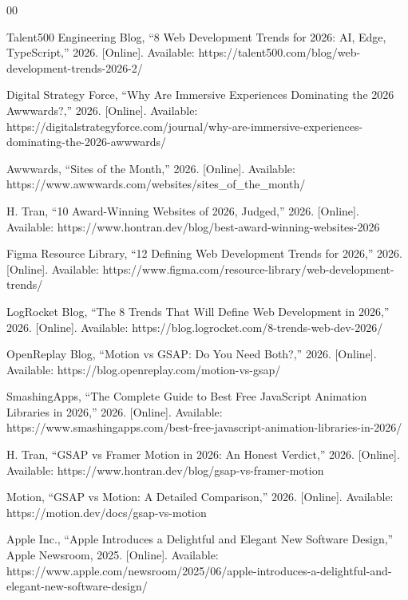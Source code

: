\documentclass[conference]{IEEEtran}
\begin{document}
\begin{thebibliography}{00}

 Talent500 Engineering Blog, ``8 Web Development Trends for 2026: AI, Edge, TypeScript,'' 2026. [Online]. Available: https://talent500.com/blog/web-development-trends-2026-2/

 Digital Strategy Force, ``Why Are Immersive Experiences Dominating the 2026 Awwwards?,'' 2026. [Online]. Available: https://digitalstrategyforce.com/journal/why-are-immersive-experiences-dominating-the-2026-awwwards/

 Awwwards, ``Sites of the Month,'' 2026. [Online]. Available: https://www.awwwards.com/websites/sites\_of\_the\_month/

 H. Tran, ``10 Award-Winning Websites of 2026, Judged,'' 2026. [Online]. Available: https://www.hontran.dev/blog/best-award-winning-websites-2026

 Figma Resource Library, ``12 Defining Web Development Trends for 2026,'' 2026. [Online]. Available: https://www.figma.com/resource-library/web-development-trends/

 LogRocket Blog, ``The 8 Trends That Will Define Web Development in 2026,'' 2026. [Online]. Available: https://blog.logrocket.com/8-trends-web-dev-2026/

 OpenReplay Blog, ``Motion vs GSAP: Do You Need Both?,'' 2026. [Online]. Available: https://blog.openreplay.com/motion-vs-gsap/

 SmashingApps, ``The Complete Guide to Best Free JavaScript Animation Libraries in 2026,'' 2026. [Online]. Available: https://www.smashingapps.com/best-free-javascript-animation-libraries-in-2026/

 H. Tran, ``GSAP vs Framer Motion in 2026: An Honest Verdict,'' 2026. [Online]. Available: https://www.hontran.dev/blog/gsap-vs-framer-motion

 Motion, ``GSAP vs Motion: A Detailed Comparison,'' 2026. [Online]. Available: https://motion.dev/docs/gsap-vs-motion

 Apple Inc., ``Apple Introduces a Delightful and Elegant New Software Design,'' Apple Newsroom, 2025. [Online]. Available: https://www.apple.com/newsroom/2025/06/apple-introduces-a-delightful-and-elegant-new-software-design/


\end{thebibliography}
\end{document}
